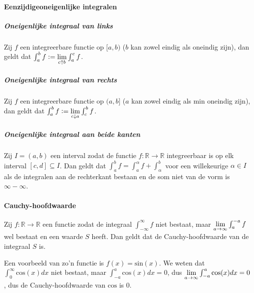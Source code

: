 \paragraph{\bq Eenzijdige\eq oneigenlijke integralen}

\subparagraph{Oneigenlijke integraal van links} Zij $f$ een integreerbare functie op $[a,b)$ ($b$ kan zowel eindig als oneindig zijn), dan geldt dat $\int_{a}^{b}f\vcentcolon=\underset{c\uparrow b}{\text{lim}}\int_{a}^{c}f$.

\subparagraph{Oneigenlijke integraal van rechts} Zij $f$ een integreerbare functie op $(a,b]$ ($a$ kan zowel eindig als min oneindig zijn), dan geldt dat $\int_{a}^{b}f\vcentcolon=\underset{c\downarrow a}{\text{lim}}\int_{c}^{b}f$.

\subparagraph{Oneigenlijke integraal aan beide kanten} Zij $I=(a,b)$ een interval zodat de functie $f:\mathbb{R}\to\mathbb{R}$ integreerbaar is op elk interval $[c,d]\subseteq I$. Dan geldt dat $\int_{a}^{b}f=\int_{a}^{\alpha}f+\int_{\alpha}^{b}$ voor een willekeurige $\alpha\in I$ als de integralen aan de rechterkant bestaan en de som niet van de vorm is $\infty-\infty$.

\paragraph{Cauchy-hoofdwaarde} Zij $f:\mathbb{R}\to\mathbb{R}$ een functie zodat de integraal $\int_{-\infty}^{\infty}f$ niet bestaat, maar $\underset{a\to\infty}{\text{lim}}\int_{a}^{-a}f$ wel bestaat en een waarde $S$ heeft. Dan geldt dat de Cauchy-hoofdwaarde van de integraal $S$ is. \medskip

Een voorbeeld van zo'n functie is $f(x)=\text{sin}(x)$. We weten dat $\int_{0}^{\infty}\text{cos}(x)dx$ niet bestaat, maar $\int_{-a}^{a}\text{cos}(x)dx=0$, dus $\underset{a\to\infty}{\text{lim}}\int_{-a}^{a}\text{cos}(x)dx=0$, dus de Cauchy-hoofdwaarde van $\text{cos}$ is $0$.
